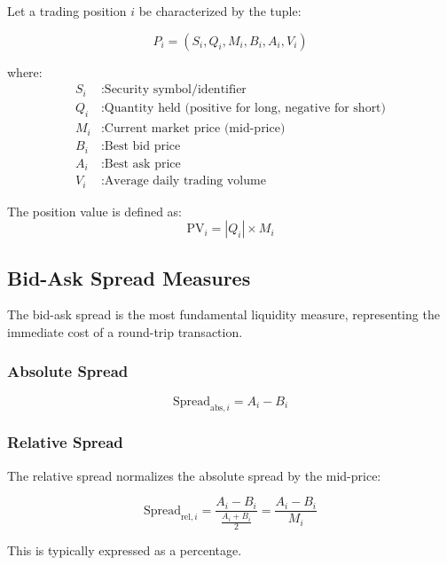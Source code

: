 \documentclass[11pt,a4paper]{article}
\begin{document}
Let a trading position $i$ be characterized by the tuple:

\begin{equation}
P_i = (S_i, Q_i, M_i, B_i, A_i, V_i)
\end{equation}

where:
\begin{align*}
S_i &: \text{Security symbol/identifier} \\
Q_i &: \text{Quantity held (positive for long, negative for short)} \\
M_i &: \text{Current market price (mid-price)} \\
B_i &: \text{Best bid price} \\
A_i &: \text{Best ask price} \\
V_i &: \text{Average daily trading volume}
\end{align*}

The position value is defined as:
\begin{equation}
\text{PV}_i = |Q_i| \times M_i
\end{equation}

\subsection{Bid-Ask Spread Measures}

The bid-ask spread is the most fundamental liquidity measure, representing the immediate cost of a round-trip transaction.

\subsubsection{Absolute Spread}

\begin{equation}
\text{Spread}_{\text{abs},i} = A_i - B_i
\end{equation}

\subsubsection{Relative Spread}

The relative spread normalizes the absolute spread by the mid-price:

\begin{equation}
\text{Spread}_{\text{rel},i} = \frac{A_i - B_i}{\frac{A_i + B_i}{2}} = \frac{A_i - B_i}{M_i}
\end{equation}

This is typically expressed as a percentage.
\end{document}
